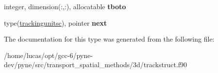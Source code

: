 \begin{DoxyCompactItemize}
\item 
integer, dimension(\+:,\+:), allocatable {\bfseries tboto}\hypertarget{structtracking__data__structures_1_1trackingunitsc_a6b3cceaa9cf6b60ea0330fc48f3ab107}{}\label{structtracking__data__structures_1_1trackingunitsc_a6b3cceaa9cf6b60ea0330fc48f3ab107}

\item 
type(\hyperlink{structtracking__data__structures_1_1trackingunitsc}{trackingunitsc}), pointer {\bfseries next}\hypertarget{structtracking__data__structures_1_1trackingunitsc_ad91a2408f427440a9f4a543bc5923a92}{}\label{structtracking__data__structures_1_1trackingunitsc_ad91a2408f427440a9f4a543bc5923a92}

\end{DoxyCompactItemize}


The documentation for this type was generated from the following file\+:\begin{DoxyCompactItemize}
\item 
/home/lucas/opt/gcc-\/6/pyne-\/dev/pyne/src/transport\+\_\+spatial\+\_\+methods/3d/trackstruct.\+f90\end{DoxyCompactItemize}
